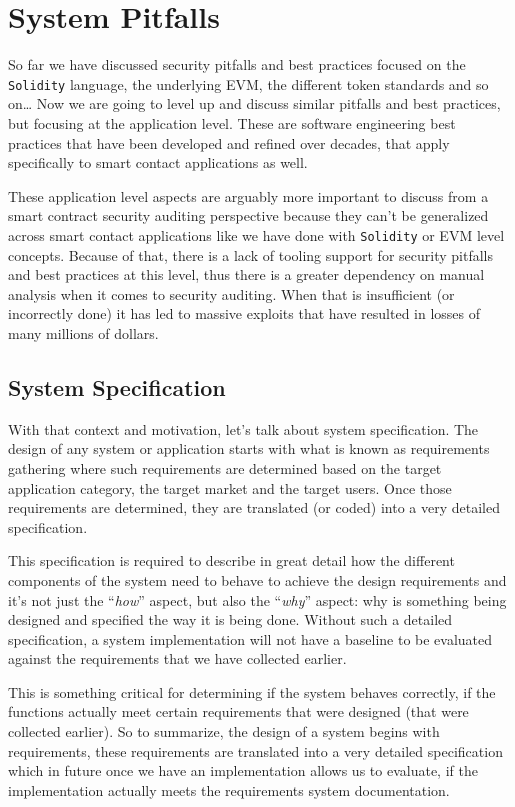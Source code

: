 \section{System Pitfalls}\label{system-pitfalls}

So far we have discussed security pitfalls and best practices focused on
the \texttt{Solidity} language, the underlying EVM, the different token
standards and so on\ldots{} Now we are going to level up and discuss
similar pitfalls and best practices, but focusing at the application
level. These are software engineering best practices that have been
developed and refined over decades, that apply specifically to smart
contact applications as well.

These application level aspects are arguably more important to discuss
from a smart contract security auditing perspective because they can't
be generalized across smart contact applications like we have done with
\texttt{Solidity} or EVM level concepts. Because of that, there is a
lack of tooling support for security pitfalls and best practices at this
level, thus there is a greater dependency on manual analysis when it
comes to security auditing. When that is insufficient (or incorrectly
done) it has led to massive exploits that have resulted in losses of
many millions of dollars.

\subsection{System Specification}\label{system-specification}

With that context and motivation, let's talk about system specification.
The design of any system or application starts with what is known as
requirements gathering where such requirements are determined based on
the target application category, the target market and the target users.
Once those requirements are determined, they are translated (or coded)
into a very detailed specification.

This specification is required to describe in great detail how the
different components of the system need to behave to achieve the design
requirements and it's not just the ``\emph{how}'' aspect, but also the
``\emph{why}'' aspect: why is something being designed and specified the
way it is being done. Without such a detailed specification, a system
implementation will not have a baseline to be evaluated against the
requirements that we have collected earlier.

This is something critical for determining if the system behaves
correctly, if the functions actually meet certain requirements that were
designed (that were collected earlier). So to summarize, the design of a
system begins with requirements, these requirements are translated into
a very detailed specification which in future once we have an
implementation allows us to evaluate, if the implementation actually
meets the requirements system documentation.


